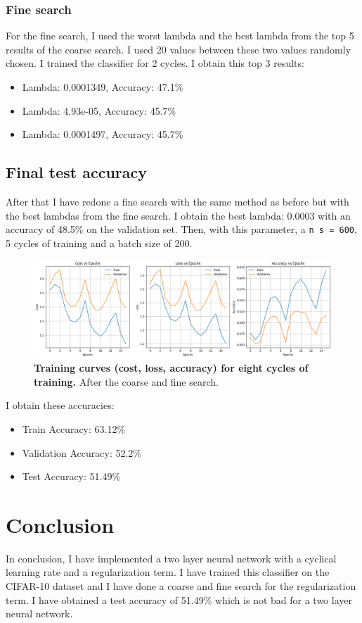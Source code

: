 \documentclass{article}
\begin{document}
\subsubsection{Fine search}
For the fine search, I used the worst lambda and the best lambda from the top 5 results of the coarse search. I used 20 values between these two values randomly chosen. I trained the classifier for 2 cycles. I obtain this top 3 results:
\begin{itemize}
    \item Lambda: 0.0001349, Accuracy: 47.1\%
    \item Lambda: 4.93e-05, Accuracy: 45.7\%
    \item Lambda: 0.0001497, Accuracy: 45.7\%
\end{itemize}

\subsection{Final test accuracy}
After that I have redone a fine search with the same method as before but with the best lambdas from the fine search. I obtain the best lambda: 0.0003 with an accuracy of 48.5\% on the validation set.
Then, with this parameter, a \texttt{n s = 600}, 5 cycles of training and a batch size of 200.

\begin{figure}[H]
    \centering
    \includegraphics[width=\linewidth]{Result_Pics/final-perf.png}
    \caption{\textbf{Training curves (cost, loss, accuracy) for eight cycles of training.} After the coarse and fine search.}
    \label{fig:final}
\end{figure}

I obtain these accuracies:
\begin{itemize}
    \item Train Accuracy: 63.12\%
    \item Validation Accuracy: 52.2\%
    \item Test Accuracy: 51.49\%
\end{itemize}

\section{Conclusion}
In conclusion, I have implemented a two layer neural network with a cyclical learning rate and a regularization term. I have trained this classifier on the CIFAR-10 dataset and I have done a coarse and fine search for the regularization term. I have obtained a test accuracy of 51.49\% which is not bad for a two layer neural network.
\end{document}
